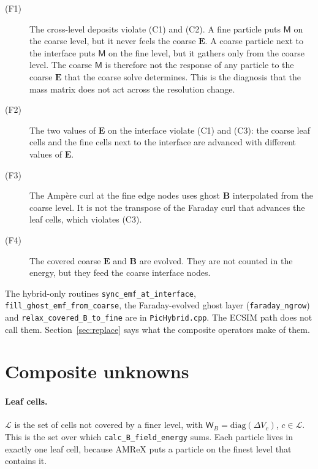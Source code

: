 \documentclass[a4paper,11pt]{article}
\newcommand{\code}[1]{\texttt{#1}}
\newcommand{\Mm}{\mathsf{M}}
\newcommand{\Wb}{\mathsf{W}_B}
\newcommand{\Cset}{\mathcal{L}}
\begin{document}
\begin{description}
\item[(F1)] The cross-level deposits violate (C1) and (C2). A fine particle puts
  $\Mm$ on the coarse level, but it never feels the coarse $\mathbf{E}$. A coarse particle
  next to the interface puts $\Mm$ on the fine level, but it gathers only from the
  coarse level. The coarse $\Mm$ is therefore not the response of any particle to
  the coarse $\mathbf{E}$ that the coarse solve determines. This is the diagnosis
  that the mass matrix does not act across the resolution change.
\item[(F2)] The two values of $\mathbf{E}$ on the interface violate (C1) and (C3):
  the coarse leaf cells and the fine cells next to the interface are advanced with
  different values of $\mathbf{E}$.
\item[(F3)] The Ampère curl at the fine edge nodes uses ghost $\mathbf{B}$
  interpolated from the coarse level. It is not the transpose of the Faraday curl
  that advances the leaf cells, which violates (C3).
\item[(F4)] The covered coarse $\mathbf{E}$ and $\mathbf{B}$ are evolved. They are
  not counted in the energy, but they feed the coarse interface nodes.
\end{description}
The hybrid-only routines \code{sync\_emf\_at\_interface}, \code{fill\_ghost\_emf\_from\_coarse},
the Faraday-evolved ghost layer (\code{faraday\_ngrow}) and
\code{relax\_covered\_B\_to\_fine} are in \code{PicHybrid.cpp}. The ECSIM path does not
call them. Section~\ref{sec:replace} says what the composite operators make of them.

\section{Composite unknowns}\label{sec:unknowns}

\paragraph{Leaf cells.} $\Cset$ is the set of cells not covered by a finer level,
with $\Wb=\mathrm{diag}(\Delta V_c)$, $c\in\Cset$. This is the set over which
\code{calc\_B\_field\_energy} sums. Each particle lives in exactly one leaf cell,
because AMReX puts a particle on the finest level that contains it.
\end{document}
